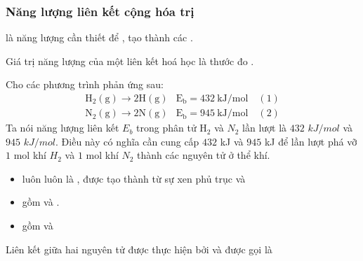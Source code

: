 \subsubsection{Năng lượng liên kết cộng hóa trị}
\begin{ghinho}
	 là năng lượng cần thiết để  , tạo thành các .
	
	Giá trị năng lượng của một liên kết hoá học là thước đo .
\end{ghinho}
\begin{vidu}
	Cho các phương trình phản ứng sau:
	$$
	\begin{array}{ll}
		\mathrm{H}_2(\mathrm{g}) \rightarrow 2\mathrm{H}(\mathrm{g}) & \mathrm{E}_{\mathrm{b}}=432 \mathrm{~kJ}/\mathrm{mol} \quad (1) \\
		\mathrm{N}_2(\mathrm{g}) \rightarrow 2\mathrm{N}(\mathrm{g}) & \mathrm{E}_{\mathrm{b}}=945 \mathrm{~kJ}/\mathrm{mol} \quad (2)
	\end{array}
	$$
	Ta nói năng lượng liên kết ${E}_{b}$ trong phân tử $\mathrm{H}_2$ và $N_2$ lần lượt là $432$ $kJ/mol$ và $945$ $kJ/mol$. Điều này có nghĩa cần cung cấp $432$ kJ và $945$ kJ để lần lượt phá vỡ $1$ mol khí $H_2$ và $1$ mol khí ${N}_2$ thành các nguyên tử ở thể khí.
\end{vidu}
\begin{ghinho}
	\begin{itemize}
		\item {} luôn luôn là , được tạo thành từ sự xen phủ trục và 
		\item {} gồm   và  .
		\item {} gồm  và 
	\end{itemize}
\end{ghinho}
\begin{luuy}
	Liên kết giữa hai nguyên tử được thực hiện bởi  và  được gọi là 
\end{luuy}